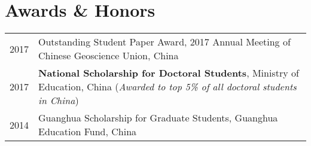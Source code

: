 \section*{Awards \& Honors}

\begin{tabular}{p{} p{}}
2017 & Outstanding Student Paper Award, 2017 Annual Meeting of Chinese Geoscience Union, China \\
2017 & \textbf{National Scholarship for Doctoral Students}, Ministry of Education, China \newline
        (\textit{Awarded to top 5\% of all doctoral students in China}) \\
2014 & Guanghua Scholarship for Graduate Students, Guanghua Education Fund, China \\
\end{tabular}
